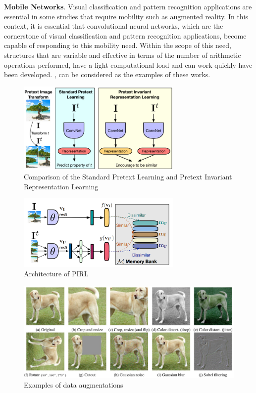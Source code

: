 \documentclass[conference]{IEEEtran}
\begin{document}
\textbf{Mobile Networks}. Visual classification and pattern recognition applications are essential in some studies that require mobility such as augmented reality. In this context, it is essential that convolutional neural networks, which are the cornerstone of visual classification and pattern recognition applications, become capable of responding to this mobility need. Within the scope of this need, structures that are variable and effective in terms of the number of arithmetic operations performed, have a light computational load and can work quickly have been developed. \cite{mobile3,efficientnet,mnasnet,shuffle}, can be considered as the examples of these works.  


\begin{figure}[h]
\centerline{\includegraphics[width=8cm]{fig1.jpg}}
\caption{Comparison of the Standard Pretext Learning and Pretext Invariant Representation Learning \cite{PIRL}}
\label{fig}
\end{figure}

\begin{figure}[h]
\centerline{\includegraphics[width=8cm]{PIRL_arch.png}}
\caption{Architecture of PIRL \cite{PIRL}}
\label{fig_PIRL_arch}
\end{figure}

\begin{figure}[h]
\includegraphics[width=\textwidth]{fig2.jpg}
\centering
\caption{Examples of data augmentations \cite{SimCLR}}
\label{fig2}
\end{figure}
\end{document}
